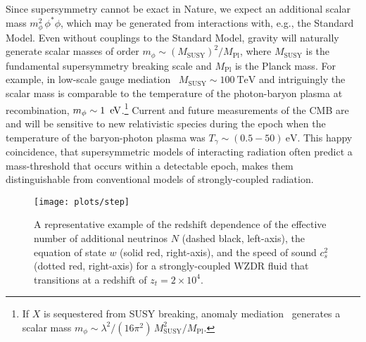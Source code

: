 \documentclass[aps,prd,twocolumn,nofootinbib,superscriptaddress]{revtex4}
\newcommand{\TeV}{\text{TeV}}
\newcommand{\eV}{\text{eV}}
\def\ev{\,{\rm eV}}
\begin{document}
Since supersymmetry cannot be exact in Nature, we expect an additional scalar mass $m_\phi^2 \, \phi^* \phi$, which may be generated from interactions with, e.g., the Standard Model. Even without couplings to the Standard Model, gravity will naturally generate scalar masses of order $m_\phi \sim (M_\text{SUSY})^2/M_\text{Pl}$, where $M_\text{SUSY}$ is the fundamental supersymmetry breaking scale and $M_\text{Pl}$ is the Planck mass. For example, in low-scale gauge mediation~\cite{Dine:1993yw,Dine:1995ag} $M_\text{SUSY}\sim100 \ \TeV$ and intriguingly the scalar mass is comparable to the temperature of the photon-baryon plasma at recombination,  $m_\phi \sim 1 \ \ev$.\footnote{If $X$ is sequestered from SUSY breaking, anomaly mediation~\cite{Randall:1998uk,Giudice:1998xp} generates a scalar mass $m_\phi \sim \lambda^2/(16 \pi^2)\, M_\text{SUSY}^2/M_\text{Pl}$.} Current and future measurements of the CMB are and will be sensitive to new relativistic species during the epoch when the temperature of the baryon-photon plasma was $T_\gamma \sim (0.5 - 50) \ \eV$. This happy coincidence, that supersymmetric models of interacting radiation often predict a mass-threshold that occurs within a detectable epoch, makes them distinguishable from conventional models of strongly-coupled radiation.

\begin{figure}[t]
   \centering
   \texttt{[image: plots/step]}
   \caption{A representative example of the redshift dependence of the effective number of additional neutrinos $N$ (dashed black, left-axis), the equation of state $w$ (solid red, right-axis), and the speed of sound $c_s^2$ (dotted red, right-axis) for a strongly-coupled WZDR fluid that transitions at a redshift of $z_t = 2 \times 10^4$.}
   \label{fig:csofa}
\end{figure}
\end{document}
